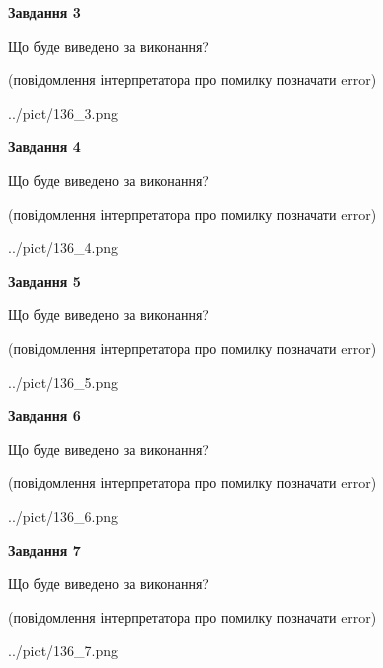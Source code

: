 \documentclass[12pt, ukrainian]{article}
\begin{document}
{\begin {large}
{\begin {center}\textbf{Завдання 3}\end {center}}\par
Що буде виведено за виконання?\par
 (повідомлення інтерпретатора про помилку позначати error)\par
\begin{center}
	{../pict/136_3.png}
\end{center}
\newpage

{\begin {center}\textbf{Завдання 4}\end {center}}\par
Що буде виведено за виконання?\par
 (повідомлення інтерпретатора про помилку позначати error)\par
\begin{center}
	{../pict/136_4.png}
\end{center}
\newpage

{\begin {center}\textbf{Завдання 5}\end {center}}\par
Що буде виведено за виконання?\par
 (повідомлення інтерпретатора про помилку позначати error)\par
\begin{center}
	{../pict/136_5.png}
\end{center}
\newpage

{\begin {center}\textbf{Завдання 6}\end {center}}\par
Що буде виведено за виконання?\par
 (повідомлення інтерпретатора про помилку позначати error)\par
\begin{center}
	{../pict/136_6.png}
\end{center}
\newpage

{\begin {center}\textbf{Завдання 7}\end {center}}\par
Що буде виведено за виконання?\par
 (повідомлення інтерпретатора про помилку позначати error)\par
\begin{center}
	{../pict/136_7.png}
\end{center}
\newpage


\end{large}}
\end{document}
